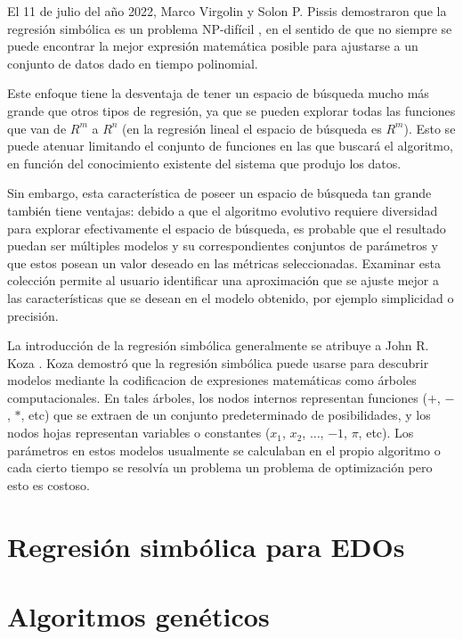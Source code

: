 El 11 de julio del año 2022, Marco Virgolin y Solon P. Pissis demostraron que la regresión simbólica es un problema NP-difícil \cite{virgolin2022symbolic}, en el sentido de que no siempre se puede encontrar la mejor expresión matemática posible para ajustarse a un conjunto de datos dado en tiempo polinomial.

Este enfoque tiene la desventaja de tener un espacio de búsqueda mucho más grande que otros tipos de regresión, ya que se pueden explorar todas las funciones que van de $R^m$ a $R^n$ (en la regresión lineal el espacio de búsqueda es $R^m$). Esto se puede atenuar limitando el conjunto de funciones en las que buscará el algoritmo, en función del conocimiento existente del sistema que produjo los datos.

Sin embargo, esta característica de poseer un espacio de búsqueda tan grande también tiene ventajas: debido a que el algoritmo evolutivo requiere diversidad para explorar efectivamente el espacio de búsqueda, es probable que el resultado puedan ser múltiples modelos y su correspondientes conjuntos de parámetros y que estos posean un valor deseado en las métricas seleccionadas. Examinar esta colección permite al usuario identificar una aproximación que se ajuste mejor a las características que se desean en el modelo obtenido, por ejemplo simplicidad o precisión.

La introducción de la regresión simbólica generalmente se atribuye a John R. Koza \cite{zelinka2005analytic}. Koza demostró que la regresión simbólica puede usarse para descubrir modelos mediante la codificacion de expresiones matemáticas como árboles computacionales. En tales árboles, los nodos internos representan funciones ($+$, $-$, $*$, etc) que se extraen de un conjunto predeterminado de posibilidades, y los nodos hojas representan variables o constantes ($x_1$, $x_2$, $\dots$, $-1$, $\pi$, etc). Los parámetros en estos modelos usualmente se calculaban en el propio algoritmo o cada cierto tiempo se resolvía un problema un problema de optimización pero esto es costoso.


\section{Regresión simbólica para EDOs}

\section{Algoritmos genéticos}

